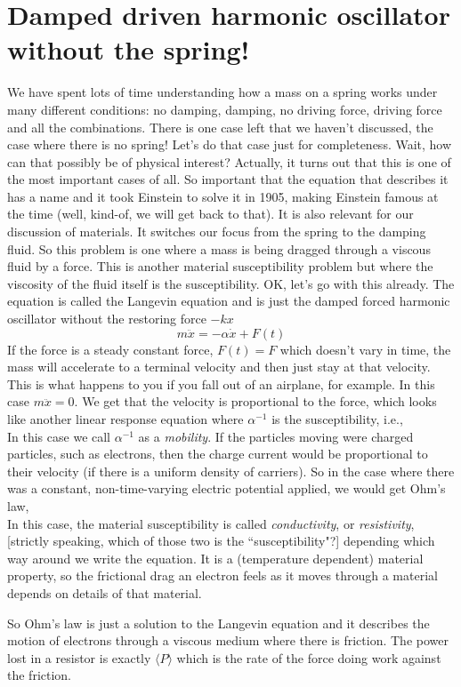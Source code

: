 \documentclass[]{revtex4}
\newcommand{\sm}[1]{{\[#1\]}}
\begin{document}
\section*{Damped driven harmonic oscillator without the spring!}
We have spent lots of time understanding how a mass on a spring works under many different conditions: no damping, damping, no driving force, driving force
and all the combinations.  There is one case left that we haven't discussed, the case where there is no spring!  Let's do that case just for completeness.
Wait, how can that possibly be of physical interest?  Actually, it turns out that this is one of the most important cases of all.  So important that
the equation that describes it has a name and it took Einstein to solve it in 1905, making Einstein famous at the time (well, kind-of, we
will get back to that).  It is also relevant for
our discussion of materials.  It switches our focus from the spring to the damping fluid.  So this problem is one where a mass is being dragged
through a viscous fluid by a force.  This is another material susceptibility problem but where the viscosity of the fluid itself is the
susceptibility.  OK, let's go with this already.  The equation is called the Langevin equation and is just the damped forced harmonic oscillator
without the restoring force $-kx$
\sm{m\ddot{x} = -\alpha \dot{x} + F(t)}
If the force is a steady constant force, $F(t)= F$ which doesn't vary in time, the mass will accelerate to a terminal velocity and then just
stay at that velocity.  This is what happens to you if you fall out of an airplane, for example.  In this case $m\ddot{x} = 0$.  We get that the
velocity is proportional to the force, which looks like another linear response equation where $\alpha^{-1}$ is the susceptibility, i.e.,
\sm{}
In this case we call $\alpha^{-1}$ as a {\it mobility}.  If the particles moving were charged particles, such as electrons, then the
charge current would be proportional to their velocity (if there is a uniform density of carriers).  So in the case where there was
a constant, non-time-varying electric potential applied, we would get Ohm's law,
\sm{}
In this case, the material susceptibility is called {\it conductivity}, or {\it resistivity}, [strictly speaking, which of those two is
the ``susceptibility"?] depending which way around we write the
equation.  It is a (temperature dependent) material property, so the frictional drag an electron feels as it moves through a material
depends on details of that material.

So Ohm's law is just a solution to the Langevin equation and it describes the motion of electrons through a viscous medium where there is
friction.  The power lost in a resistor is exactly $\langle P\rangle$ which is the rate of the force doing work against the friction.
\end{document}
